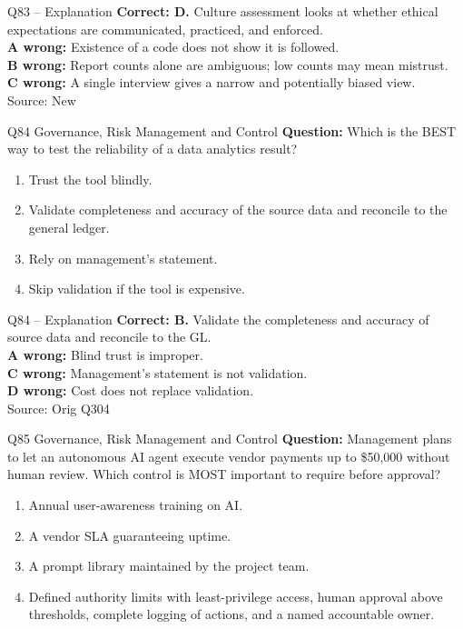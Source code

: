 \documentclass[aspectratio=169,10pt]{beamer}
\begin{document}
\begin{frame}[t]{Q83 -- Explanation}
	\footnotesize
	\textbf{Correct: D.} Culture assessment looks at whether ethical expectations are communicated, practiced, and enforced. \\[5pt]
\textbf{A wrong:} Existence of a code does not show it is followed. \\[3pt]
\textbf{B wrong:} Report counts alone are ambiguous; low counts may mean mistrust. \\[3pt]
\textbf{C wrong:} A single interview gives a narrow and potentially biased view. \\[3pt]
	\vfill {\tiny Source: New}
\end{frame}

\begin{frame}[t]{Q84 \hfill {\scriptsize Governance, Risk Management and Control}}
	\small
	\textbf{Question:} Which is the BEST way to test the reliability of a data analytics result?
	\begin{enumerate}[label=\Alph*.,itemsep=1pt,topsep=3pt]
			\item Trust the tool blindly.
			\item Validate completeness and accuracy of the source data and reconcile to the general ledger.
			\item Rely on management's statement.
			\item Skip validation if the tool is expensive.
	\end{enumerate}
\end{frame}

\begin{frame}[t]{Q84 -- Explanation}
	\footnotesize
	\textbf{Correct: B.} Validate the completeness and accuracy of source data and reconcile to the GL. \\[5pt]
\textbf{A wrong:} Blind trust is improper. \\[3pt]
\textbf{C wrong:} Management's statement is not validation. \\[3pt]
\textbf{D wrong:} Cost does not replace validation. \\[3pt]
	\vfill {\tiny Source: Orig Q304}
\end{frame}

\begin{frame}[t]{Q85 \hfill {\scriptsize Governance, Risk Management and Control}}
	\small
	\textbf{Question:} Management plans to let an autonomous AI agent execute vendor payments up to \$50,000 without human review. Which control is MOST important to require before approval?
	\begin{enumerate}[label=\Alph*.,itemsep=1pt,topsep=3pt]
			\item Annual user-awareness training on AI.
			\item A vendor SLA guaranteeing uptime.
			\item A prompt library maintained by the project team.
			\item Defined authority limits with least-privilege access, human approval above thresholds, complete logging of actions, and a named accountable owner.
	\end{enumerate}
\end{frame}
\end{document}
